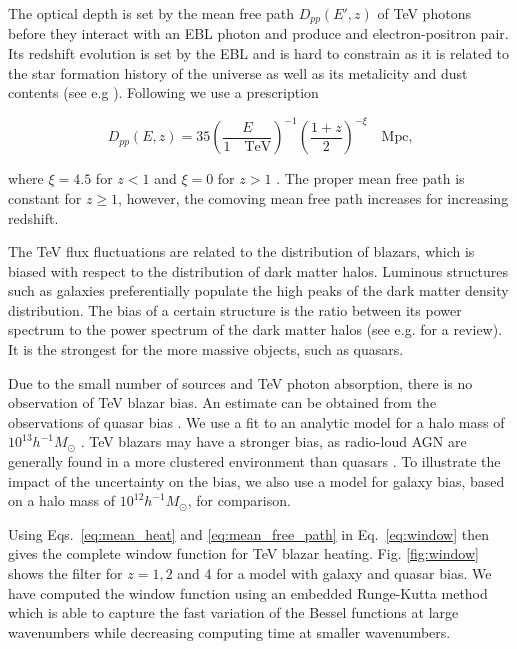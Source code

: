 \documentclass[twocolumns]{emulateapj}
\begin{document}
The optical depth is set by the mean free path  $D_{pp}(E',z)$ of  TeV photons before they interact with an EBL photon and produce and electron-positron pair. Its redshift evolution is set by the EBL and is hard to constrain as it is related to the star formation history of the universe as well as its metalicity and dust contents (see e.g \citet{2008A&A...487..837F,2006ApJ...648..774S}).  Following \citet{2012ApJ...752...23C} we use  a prescription 

  \begin{equation}
    \label{eq:mean_free_path}
  D_{pp}(E,z)=35\left(\frac{E}{1 \quad\textrm{TeV}}\right)^{-1} \left(\frac{1+z}{2}\right)^{-\xi} \quad \textrm{Mpc,}   
  \end{equation}

where $\xi=4.5$ for $z<1$ and $\xi=0$ for $z>1$ \citep{2004A&A...413..807K,2009PhRvD..80l3012N}. The proper mean free path is constant for $z\geq 1$, however, the comoving mean free path increases for increasing redshift.



The TeV flux fluctuations are related to the distribution of blazars, which is biased with respect to the distribution of dark matter halos. Luminous structures such as galaxies preferentially populate the high peaks of the dark matter density distribution.  The bias of a certain structure is the ratio between its power spectrum to the power spectrum of the dark matter halos (see e.g. \citet{2002PhR...372....1C} for a review). It is the strongest for the more massive objects, such as quasars. 

Due to the small number of sources and TeV photon absorption, there is no observation of  TeV blazar bias. An estimate can be obtained from the observations of quasar bias \citep{2005MNRAS.356..415C,2007ApJ...658...85M,2007AJ....133.2222S}. We use a fit to an analytic model for a halo mass of $10^{13}h^{-1}M_{\odot}$ \citep{2008ApJ...678..627B}.  TeV blazars may have a stronger bias, as radio-loud AGN are generally found in a more clustered environment than quasars \citep{2009MNRAS.393..377M,2012MNRAS.421.3060S}. To illustrate the impact of the uncertainty on the bias, we also use a model for galaxy bias, based on a  halo mass of $10^{12}h^{-1} M_{\odot}$,  for comparison. 



Using Eqs.~\ref{eq:mean_heat} and \ref{eq:mean_free_path} in Eq.~\ref{eq:window} then gives the complete window function for TeV blazar heating. Fig. \ref{fig:window} shows the filter for $z=1,2$ and 4 for a model with galaxy and quasar bias. We have computed the window function using an embedded Runge-Kutta method which is able to capture the fast variation of the Bessel functions at large wavenumbers while decreasing computing time at smaller wavenumbers.
\end{document}
